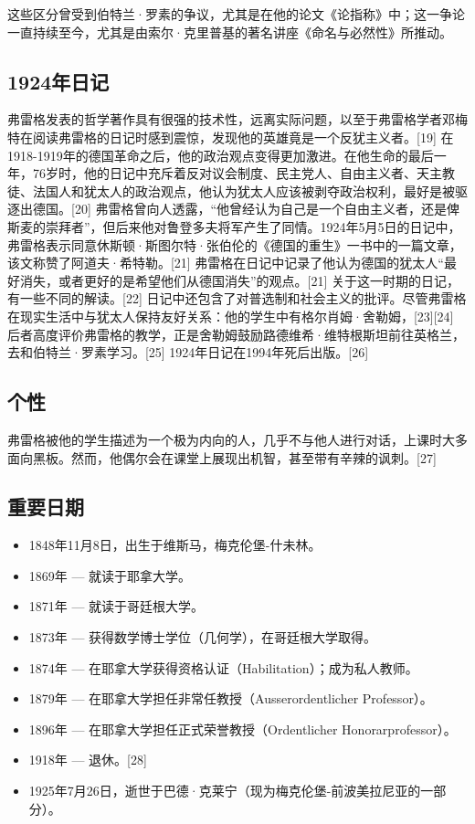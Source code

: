 这些区分曾受到伯特兰·罗素的争议，尤其是在他的论文《论指称》中；这一争论一直持续至今，尤其是由索尔·克里普基的著名讲座《命名与必然性》所推动。
\subsection{1924年日记}
弗雷格发表的哲学著作具有很强的技术性，远离实际问题，以至于弗雷格学者邓梅特在阅读弗雷格的日记时感到震惊，发现他的英雄竟是一个反犹主义者。[19] 在1918-1919年的德国革命之后，他的政治观点变得更加激进。在他生命的最后一年，76岁时，他的日记中充斥着反对议会制度、民主党人、自由主义者、天主教徒、法国人和犹太人的政治观点，他认为犹太人应该被剥夺政治权利，最好是被驱逐出德国。[20] 弗雷格曾向人透露，“他曾经认为自己是一个自由主义者，还是俾斯麦的崇拜者”，但后来他对鲁登多夫将军产生了同情。1924年5月5日的日记中，弗雷格表示同意休斯顿·斯图尔特·张伯伦的《德国的重生》一书中的一篇文章，该文称赞了阿道夫·希特勒。[21] 弗雷格在日记中记录了他认为德国的犹太人“最好消失，或者更好的是希望他们从德国消失”的观点。[21] 关于这一时期的日记，有一些不同的解读。[22] 日记中还包含了对普选制和社会主义的批评。尽管弗雷格在现实生活中与犹太人保持友好关系：他的学生中有格尔肖姆·舍勒姆，[23][24] 后者高度评价弗雷格的教学，正是舍勒姆鼓励路德维希·维特根斯坦前往英格兰，去和伯特兰·罗素学习。[25] 1924年日记在1994年死后出版。[26]
\subsection{个性}
弗雷格被他的学生描述为一个极为内向的人，几乎不与他人进行对话，上课时大多面向黑板。然而，他偶尔会在课堂上展现出机智，甚至带有辛辣的讽刺。[27]
\subsection{重要日期}  
\begin{itemize}
\item 1848年11月8日，出生于维斯马，梅克伦堡-什未林。  
\item 1869年 — 就读于耶拿大学。  
\item 1871年 — 就读于哥廷根大学。  
\item 1873年 — 获得数学博士学位（几何学），在哥廷根大学取得。  
\item 1874年 — 在耶拿大学获得资格认证（Habilitation）；成为私人教师。  
\item 1879年 — 在耶拿大学担任非常任教授（Ausserordentlicher Professor）。  
\item 1896年 — 在耶拿大学担任正式荣誉教授（Ordentlicher Honorarprofessor）。  
\item 1918年 — 退休。[28]  
\item 1925年7月26日，逝世于巴德·克莱宁（现为梅克伦堡-前波美拉尼亚的一部分）。
\end{itemize}
